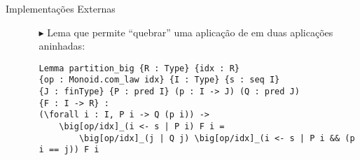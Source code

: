 \begin{frame}[fragile]{Implementações Externas}
    \begin{itemize}
        \item[]
        \begin{itemize}
            \item[$\blacktriangleright$] Lema  que permite ``quebrar'' uma aplicação de  em duas aplicações aninhadas:
                \begin{lstlisting}[language=coq,frame=single,tabsize=1]
Lemma partition_big {R : Type} {idx : R} 
{op : Monoid.com_law idx} {I : Type} {s : seq I} 
{J : finType} {P : pred I} (p : I -> J) (Q : pred J) 
{F : I -> R} :
(\forall i : I, P i -> Q (p i)) ->
    \big[op/idx]_(i <- s | P i) F i =
        \big[op/idx]_(j | Q j) \big[op/idx]_(i <- s | P i && (p i == j)) F i
                \end{lstlisting}

        \end{itemize}
    \end{itemize}
\end{frame}

